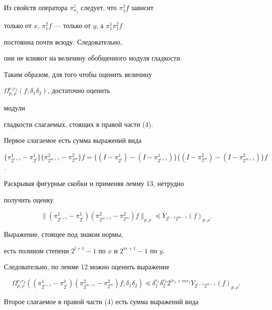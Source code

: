 Из свойств оператора $\pi^j_{n_j}$ следует, что $\pi^1_1f$ зависит 


только от $x$, $\pi^2_1f$ --- только от $y$, а $\pi^1_1\pi^2_1f$ 


постоянна почти всюду. Следовательно, 


они не влияют на величину обобщенного модуля гладкости. 


Таким образом, для того чтобы оценить величину 


$\Omega^{r_1r_2}_{p,\rho}(f;\delta_1\delta_2)$, достаточно оценить 


модули 


гладкости слагаемых, стоящих в правой части (4). 


 


Первое слагаемое есть сумма выражений вида 


$\{\pi^1_{2^{l+1}}-\pi^1_{2^l}\}\{\pi^2_{2^{m+1}}-\pi^2_{2^m}\}f= 


\{(I-\pi^1_{2^l})-(I-\pi^1_{2^{l+1}})\}\{(I-\pi^2_{2^m})- 


(I-\pi^2_{2^{m+1}})\}f$. 


Раскрывая фигурные скобки и применяя лемму 13, нетрудно 


получить оценку 


$$ 


\|(\pi^1_{2^{l+1}}-\pi^1_{2^l})(\pi^2_{2^{m+1}}-\pi^2_{2^m})f 


\|_{p,\rho}\preceq Y_{2^{l-1}2^{m-1}}(f)_{p,\rho}. 


$$ 


Выражение, стоящее под знаком нормы, 


есть полином степени $2^{l+1}-1$ по $x$ и $2^{m+1}-1$ по $y$. 


Следовательно, по лемме 12 можно оценить выражение 


\begin{equation} 


\Omega^{r_1r_2}_{p,\rho}((\pi^1_{2^{l+1}}-\pi^1_{2^l}) 


(\pi^2_{2^{m+1}}-\pi^2_{2^m})f;\delta_1\delta_2)\preceq 


\delta^{r_1}_1\delta^{r_2}_2 2^{l r_1+m r_2} 


Y_{2^{l-1}2^{m-1}}(f)_{p,\rho}. 


\end{equation} 


Второе слагаемое в правой части (4) есть сумма выражений вида 


$$ 


